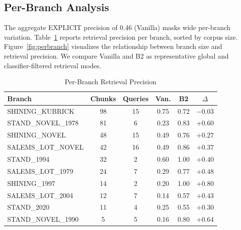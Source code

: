 \documentclass[conference]{IEEEtran}
\begin{document}
\subsection{Per-Branch Analysis}
\label{sec:perbranch}

The aggregate EXPLICIT precision of 0.46 (Vanilla) masks wide per-branch variation. Table~\ref{tab:perbranch} reports retrieval precision per branch, sorted by corpus size. Figure~\ref{fig:perbranch} visualizes the relationship between branch size and retrieval precision. We compare Vanilla and B2 as representative global and classifier-filtered retrieval modes.

\begin{table}[htbp]
\caption{Per-Branch Retrieval Precision}
\begin{center}
\begin{tabular}{lccccc}
\toprule
\textbf{Branch} & \textbf{Chunks} & \textbf{Queries} & \textbf{Van.} & \textbf{B2} & \textbf{$\Delta$} \\
\midrule
SHINING\_KUBRICK & 98 & 15 & 0.75 & 0.72 & $-0.03$ \\
STAND\_NOVEL\_1978 & 81 & 6 & 0.23 & 0.83 & $+0.60$ \\
SHINING\_NOVEL & 48 & 15 & 0.49 & 0.76 & $+0.27$ \\
SALEMS\_LOT\_NOVEL & 42 & 16 & 0.49 & 0.86 & $+0.37$ \\
STAND\_1994 & 32 & 2 & 0.60 & 1.00 & $+0.40$ \\
SALEMS\_LOT\_1979 & 24 & 7 & 0.29 & 0.77 & $+0.48$ \\
SHINING\_1997 & 14 & 2 & 0.20 & 1.00 & $+0.80$ \\
SALEMS\_LOT\_2004 & 12 & 7 & 0.14 & 0.57 & $+0.43$ \\
STAND\_2020 & 11 & 4 & 0.25 & 0.55 & $+0.30$ \\
STAND\_NOVEL\_1990 & 5 & 5 & 0.16 & 0.80 & $+0.64$ \\
\bottomrule
\end{tabular}
\label{tab:perbranch}
\end{center}
\end{table}
\end{document}
